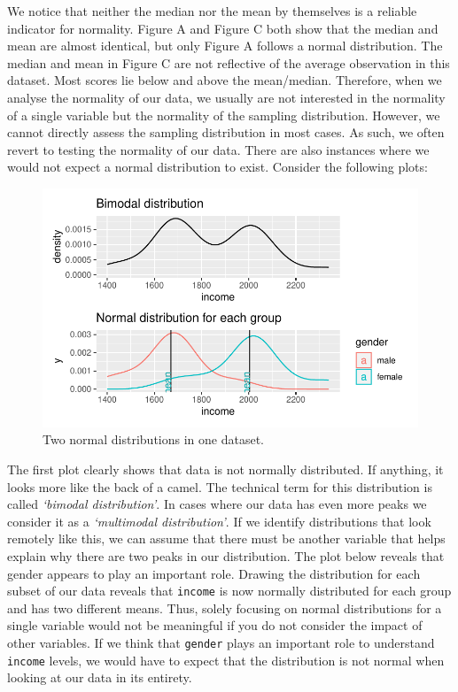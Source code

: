 \documentclass[
  letterpaper,
]{krantz}
\begin{document}
We notice that neither the median nor the mean by themselves is a
reliable indicator for normality. Figure A and Figure C both show that
the median and mean are almost identical, but only Figure A follows a
normal distribution. The median and mean in Figure C are not reflective
of the average observation in this dataset. Most scores lie below and
above the mean/median. Therefore, when we analyse the normality of our
data, we usually are not interested in the normality of a single
variable but the normality of the sampling distribution. However, we
cannot directly assess the sampling distribution in most cases. As such,
we often revert to testing the normality of our data. There are also
instances where we would not expect a normal distribution to exist.
Consider the following plots:

\begin{figure}[H]

{\centering \includegraphics{09_sources_of_bias_files/figure-pdf/two-normalities-groups-1.pdf}

}

\caption{Two normal distributions in one dataset.}

\end{figure}%

The first plot clearly shows that data is not normally distributed. If
anything, it looks more like the back of a camel. The technical term for
this distribution is called \emph{`bimodal distribution'}. In cases
where our data has even more peaks we consider it as a \emph{`multimodal
distribution'}. If we identify distributions that look remotely like
this, we can assume that there must be another variable that helps
explain why there are two peaks in our distribution. The plot below
reveals that gender appears to play an important role. Drawing the
distribution for each subset of our data reveals that \texttt{income} is
now normally distributed for each group and has two different means.
Thus, solely focusing on normal distributions for a single variable
would not be meaningful if you do not consider the impact of other
variables. If we think that \texttt{gender} plays an important role to
understand \texttt{income} levels, we would have to expect that the
distribution is not normal when looking at our data in its entirety.
\end{document}
